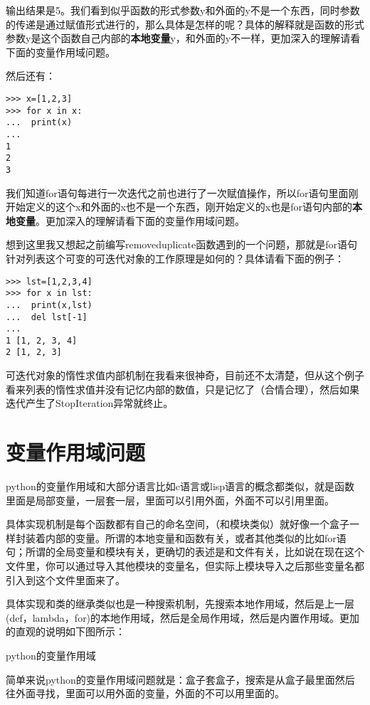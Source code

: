 \documentclass[12pt,oneside]{book}
\begin{document}
\begin{common-format}
输出结果是5。我们看到似乎函数的形式参数y和外面的y不是一个东西，同时参数的传递是通过赋值形式进行的，那么具体是怎样的呢？具体的解释就是函数的形式参数y是这个函数自己内部的\textbf{本地变量}y，和外面的y不一样，更加深入的理解请看下面的变量作用域问题。

然后还有：
\begin{Verbatim}
>>> x=[1,2,3]
>>> for x in x:
...  print(x)
... 
1
2
3
\end{Verbatim}
我们知道for语句每进行一次迭代之前也进行了一次赋值操作，所以for语句里面刚开始定义的这个x和外面的x也不是一个东西，刚开始定义的x也是for语句内部的\textbf{本地变量}。更加深入的理解请看下面的变量作用域问题。

想到这里我又想起之前编写removeduplicate函数遇到的一个问题，那就是for语句针对列表这个可变的可迭代对象的工作原理是如何的？具体请看下面的例子：
\begin{Verbatim}
>>> lst=[1,2,3,4]
>>> for x in lst:
...  print(x,lst)
...  del lst[-1]
... 
1 [1, 2, 3, 4]
2 [1, 2, 3]
\end{Verbatim}
可迭代对象的惰性求值内部机制在我看来很神奇，目前还不太清楚，但从这个例子看来列表的惰性求值并没有记忆内部的数值，只是记忆了（合情合理），然后如果迭代产生了StopIteration异常就终止。



\section{变量作用域问题}
python的变量作用域和大部分语言比如c语言或lisp语言的概念都类似，就是函数里面是局部变量，一层套一层，里面可以引用外面，外面不可以引用里面。

具体实现机制是每个函数都有自己的命名空间，（和模块类似）就好像一个盒子一样封装着内部的变量。所谓的本地变量和函数有关，或者其他类似的比如for语句；所谓的全局变量和模块有关，更确切的表述是和文件有关，比如说在现在这个文件里，你可以通过导入其他模块的变量名，但实际上模块导入之后那些变量名都引入到这个文件里面来了。

具体实现和类的继承类似也是一种搜索机制，先搜索本地作用域，然后是上一层(def，lambda，for)的本地作用域，然后是全局作用域，然后是内置作用域。更加的直观的说明如下图所示：
\begin{fig}{python的变量作用域}
\caption{python的变量作用域}
\label{fig:python的变量作用域}
\end{fig}

简单来说python的变量作用域问题就是：盒子套盒子，搜索是从盒子最里面然后往外面寻找，里面可以用外面的变量，外面的不可以用里面的。



\end{common-format}
\end{document}
